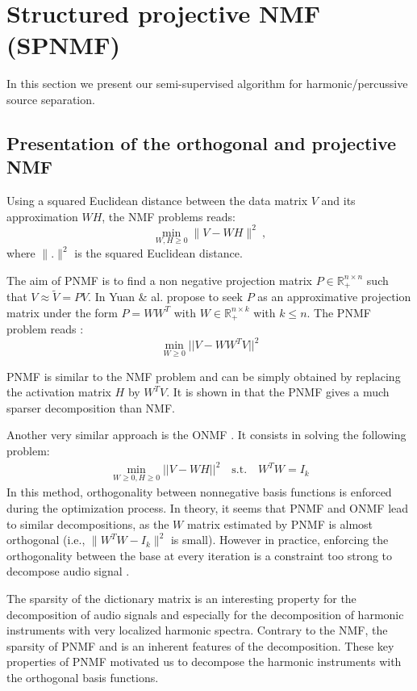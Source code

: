 \documentclass[journal]{IEEEtran}
\begin{document}
\section{Structured projective NMF (SPNMF)}
\label{sec:SPNMF}

In this section we present our semi-supervised algorithm for harmonic/percussive source separation.

\subsection{Presentation of the orthogonal and projective NMF}\label{subsec:PNMF}


Using a squared Euclidean distance between the data matrix $V$ and its approximation $WH$, the NMF problems reads:
$$
\min_{W,H\geq 0} \|V - WH\|^2\ , 
$$
where $\|.\|^{2}$ is the squared Euclidean distance.

The aim of PNMF is to find a non negative projection matrix $P \in \mathbb{R}_{+}^{n \times n}$ such that $V \approx \tilde{V} = PV$. In \cite{yuanOja2005} Yuan \& al. propose to seek $P$ as an approximative projection matrix under the form $P = WW^{T}$ with $W \in \mathbb{R}_{+}^{n \times k}$ with $ k \leqslant n $. The PNMF problem reads : 
\begin{equation}\label{EqPnmf}
\min_{W \geqslant 0} ||V - WW^{T}V||^2 
\end{equation}

PNMF is similar to the NMF problem and can be simply obtained by replacing the activation matrix $H$ by $W^TV$. It is shown in \cite{YangOja10} that the PNMF gives a much sparser decomposition than NMF.

Another very similar approach is the ONMF \cite{choi}. It consists in solving the following problem: 
\begin{align}
\min_{W \geqslant 0, H \geqslant0} ||V - WH||^2 \quad   \text{s.t}.\quad W^{T}W=I_{k} 
\end{align}%
In this method, orthogonality between nonnegative basis functions is enforced during the optimization process. In theory, it seems that PNMF and ONMF lead to similar decompositions, as the $W$ matrix estimated by PNMF is almost orthogonal (i.e., $\|W^{T}W-I_{k}\|^{2}$ is small). However in practice, enforcing the orthogonality between the base at every iteration is a constraint too strong to decompose audio signal \cite{laroche2015structured}. 

The sparsity of the dictionary matrix is an interesting property for the decomposition of audio signals and especially for the decomposition of harmonic instruments with very localized harmonic spectra. Contrary to the NMF, the sparsity of PNMF and is an inherent features of the decomposition. These key properties of PNMF motivated us to decompose the harmonic instruments with the orthogonal basis functions.
\end{document}
